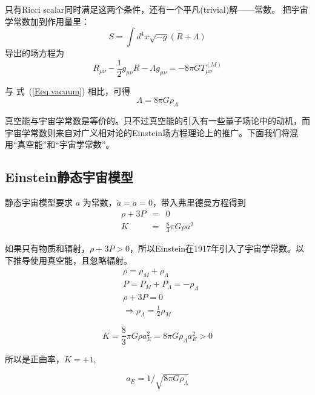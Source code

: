 \documentclass[12pt]{ctexart}
\newcommand{\refeq}[1]{式~(\ref{#1})}
\begin{document}
只有Ricci scalar同时满足这两个条件，还有一个平凡(trivial)解——常数。 把宇宙学常数加到作用量里：
\begin{equation}
    S = \int d^4 x \sqrt{-g} \left( R  + \Lambda \right) 
\end{equation}
导出的场方程为
\begin{equation}
    R_{\mu\nu} - \frac{1}{2} g_{\mu\nu} R - \Lambda g_{\mu\nu} =  -8\pi G T_{\mu\nu}^{(M)} 
\end{equation}

与 \refeq{Eeq.vacuum} 相比，可得
\begin{equation}
    \Lambda = 8\pi G \rho_\Lambda 
\end{equation}

真空能与宇宙学常数是等价的。只不过真空能的引入有一些量子场论中的动机，而宇宙学常数则来自对广义相对论的Einstein场方程理论上的推广。下面我们将混用“真空能”和“宇宙学常数”。

\subsection{Einstein静态宇宙模型}

静态宇宙模型要求 $a$ 为常数，$\dot{a}=\ddot{a}=0$，带入弗里德曼方程得到
\begin{eqnarray}
    \rho+3P&=&0 \\
    K &=& \frac{8}{3} \pi G \rho a^2
\end{eqnarray}

如果只有物质和辐射，$\rho+3P>0$，所以Einstein在1917年引入了宇宙学常数。以下推导使用真空能，且忽略辐射。
\begin{equation}
    \begin{aligned}
    &\rho=\rho_{M}+\rho_{\Lambda}\\
    &P=P_{M}+P_{\Lambda}=-\rho_{\Lambda}\\
    &\rho+3 P = 0 \\
    & \Rightarrow \rho_{\Lambda}=\frac{1}{2} \rho_{M}
    \end{aligned}
\end{equation}

\begin{equation}
    K=\frac{8}{3} \pi G \rho a_{E}^{2}=8\pi G \rho_\Lambda a_{E}^{2}>0
\end{equation}

所以是正曲率，$K=+1$,

\begin{equation}
    a_E = 1/\sqrt{8\pi G \rho_\Lambda}
\end{equation}
\end{document}
